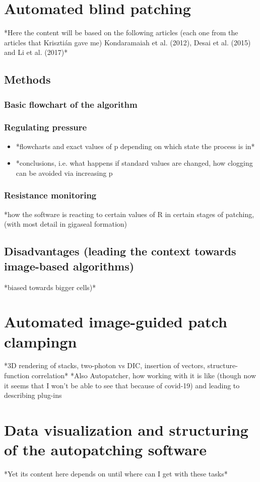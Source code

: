 \documentclass[12pt]{report}
\theoremstyle{definition}
\begin{document}
\chapter{Automated blind patching}

*Here the content will be based on the following articles (each one from the articles that Krisztián gave me) Kondaramaiah et al. (2012), Desai et al. (2015) and Li et al. (2017)*

\section{Methods}
\subsection{Basic flowchart of the algorithm}
\subsection{Regulating pressure}
\begin{itemize}
	\item *flowcharts and exact values of p depending on which state the process is in*
	\item *conclusions, i.e. what happens if standard values are changed, how clogging can be avoided via increasing p
\end{itemize}
\subsection{Resistance monitoring}
*how the software is reacting to certain values of R in certain stages of patching, (with most detail in gigaseal formation)
\section{Disadvantages (leading the context towards image-based algorithms)}
*biased towards bigger cells)*

\chapter{Automated image-guided patch clampingn}
*3D rendering of stacks, two-photon vs DIC, insertion of vectors, structure-function correlation*
*Also Autopatcher, how working with it is like (though now it seems that I won’t be able to see that because of covid-19) and leading to describing plug-ins

\chapter{Data visualization and structuring of the autopatching software}
*Yet its content here depends on until where can I get with these tasks*
\end{document}
